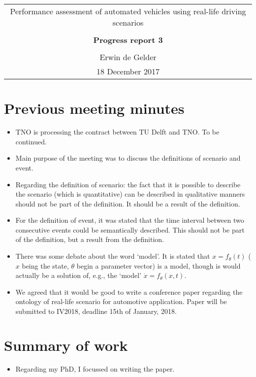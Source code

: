 \documentclass[10pt,final,a4paper,oneside,onecolumn]{article}
\newcommand{\progressreportnumber}{3}
\renewcommand{\author}{Erwin de Gelder}
\renewcommand{\date}{18 December 2017}
\renewcommand{\title}{Performance assessment of automated vehicles using real-life driving scenarios}
\begin{document}
	
\begin{center}
	\begin{tabular}{c}
		\title \\ \\
		\textbf{\huge Progress report \progressreportnumber} \\ \\
		\author \\ 
		\date
	\end{tabular}
\end{center}

\section{Previous meeting minutes}

\begin{itemize}
	\item TNO is processing the contract between TU Delft and TNO. To be continued.
	\item Main purpose of the meeting was to discuss the definitions of scenario and event.
	\item Regarding the definition of scenario: the fact that it is possible to describe the scenario (which is quantitative) can be described in qualitative manners should not be part of the definition. It should be a result of the definition.
	\item For the definition of event, it was stated that the time interval between two consecutive events could be semantically described. This should not be part of the definition, but a result from the definition.
	\item There was some debate about the word `model'. It is stated that $x=f_\theta(t)$ ($x$ being the state, $\theta$ begin a parameter vector) is a model, though is would actually be a solution of, e.g., the `model' $\dot{x}=f_\theta(x, t)$.
	\item We agreed that it would be good to write a conference paper regarding the ontology of real-life scenario for automotive application. Paper will be submitted to IV2018, deadline 15th of January, 2018.
\end{itemize}

\section{Summary of work}

\begin{itemize}
	\item Regarding my PhD, I focussed on writing the paper. 
\end{itemize}
\end{document}

